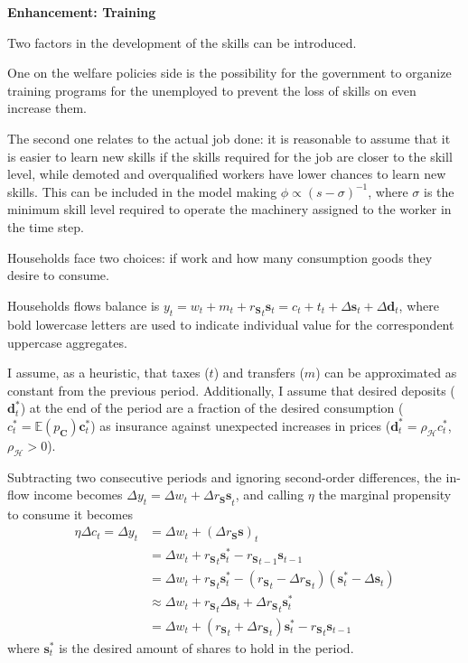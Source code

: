 \documentclass[a4paper, headings=standardclasses]{scrartcl}
\newenvironment{enh}[1][]{\begin{framed}\noindent\textbf{Enhancement: #1}\par}{\end{framed}}
\begin{document}
\begin{enh}[Training]
	Two factors in the development of the skills can be introduced.

	One on the welfare policies side is the possibility for the government to organize training programs for the unemployed to prevent the loss of skills on even increase them.

	The second one relates to the actual job done: it is reasonable to assume that it is easier to learn new skills if the skills required for the job are closer to the skill level, while demoted and overqualified workers have lower chances to learn new skills. This can be included in the model making $\phi \propto (s-\sigma)^{-1}$, where $\sigma$ is the minimum skill level required to operate the machinery assigned to the worker in the time step.
\end{enh}

Households face two choices: if work and how many consumption goods they desire to consume.

Households flows balance is $y_t = w_t + m_t + {r_{\mathbf{S}}}_t \mathbf{s}_t = c_t + t_t + {\Delta \mathbf{s}}_t + {\Delta \mathbf{d}}_t$, where bold lowercase letters are used to indicate individual value for the correspondent uppercase aggregates.

I assume, as a heuristic, that taxes ($t$) and transfers ($m$) can be approximated as constant from the previous period.
Additionally, I assume that desired deposits ($\mathbf{d}^*_t$) at the end of the period are a fraction of the desired consumption ($c^*_t = \mathbb{E}(p_\mathbf{C}) \mathbf{c}^*_t$) as insurance against unexpected increases in prices ($\mathbf{d}^*_t = \rho_\mathcal{H}c^*_t$, $\rho_\mathcal{H} > 0$).

Subtracting two consecutive periods and ignoring second-order differences, the in-flow income becomes ${\Delta y}_t = {\Delta w}_t + {\Delta r_\mathbf{S} \mathbf{s} }_t$, and calling $\eta$ the marginal propensity to consume it becomes
\begin{align*}
	\eta {\Delta c}_t = {\Delta y}_t & = {\Delta w}_t + {(\Delta r_\mathbf{S} \mathbf{s})}_t                                                                                            \\
	                                 & = {\Delta w}_t + {r_\mathbf{S}}_t \mathbf{s}^*_t - {r_\mathbf{S}}_{t-1} \mathbf{s}_{t-1}                                                         \\
	                                 & = {\Delta w}_t + {r_\mathbf{S}}_t \mathbf{s}^*_t - ({r_\mathbf{S}}_{t} - {\Delta r_\mathbf{S}}_{t}) (\mathbf{s}^*_{t} - {\Delta \mathbf{s}}_{t}) \\
	                                 & \approx {\Delta w}_t + {r_\mathbf{S}}_t {\Delta \mathbf{s}}_t + {\Delta r_\mathbf{S}}_{t} \mathbf{s}^*_{t}                                       \\
	                                 & = {\Delta w}_t + ({r_\mathbf{S}}_t + {\Delta r_\mathbf{S}}_{t})\mathbf{s}^*_t - {r_\mathbf{S}}_{t} \mathbf{s}_{t-1}
\end{align*}
where $\mathbf{s}^*_t$ is the desired amount of shares to hold in the period.
\end{document}
